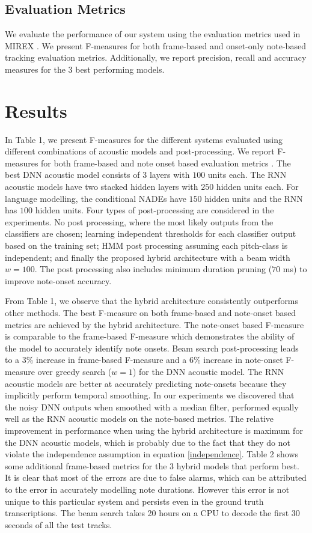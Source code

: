 \documentclass{article}
\begin{document}
\subsection{Evaluation Metrics}

We evaluate the performance of our system using the evaluation metrics used in MIREX \cite{bay2009evaluation}. We present F-measures for both frame-based and onset-only note-based tracking evaluation metrics. Additionally, we report precision, recall and accuracy measures for the 3 best performing models.

\section{Results}
In Table 1, we present F-measures for the different systems evaluated using different combinations of acoustic models and post-processing. We report F-measures for both frame-based and note onset based evaluation metrics \cite{bay2009evaluation}. The best DNN acoustic model consists of $3$ layers with $100$ units each. The RNN acoustic models have two stacked hidden layers with $250$ hidden units each. For language modelling, the conditional NADEs have $150$ hidden units and the RNN has $100$ hidden units. Four types of post-processing are considered in the experiments. No post processing, where the most likely outputs from the classifiers are chosen; learning independent thresholds for each classifier output based on the training set; HMM post processing assuming each pitch-class is independent; and finally the proposed hybrid architecture with a beam width $w = 100$. The post processing also includes minimum duration pruning ($70$ ms) to improve note-onset accuracy. 

From Table 1, we observe that the hybrid architecture consistently outperforms other methods. The best F-measure on both frame-based and note-onset based metrics are achieved by the hybrid architecture. The note-onset based F-measure is comparable to the frame-based F-measure which demonstrates the ability of the model to accurately identify note onsets. Beam search post-processing leads to a $3\%$ increase in frame-based F-measure and a $6\%$ increase in note-onset F-measure over greedy search ($w = 1$) for the DNN acoustic model. The RNN acoustic models are better at accurately predicting note-onsets because they implicitly perform temporal smoothing. In our experiments we discovered that the noisy DNN outputs when smoothed with a median filter, performed equally well as the RNN acoustic models on the note-based metrics. The relative improvement in performance when using the hybrid architecture is maximum for the DNN acoustic models, which is probably due to the fact that they do not violate the independence assumption in equation \ref{independence}.  Table 2 shows some additional frame-based metrics for the 3 hybrid models that perform best. It is clear that most of the errors are due to false alarms, which can be attributed to the error in accurately modelling note durations. However this error is not unique to this particular system and persists even in the ground truth transcriptions. The beam search takes 20 hours on a CPU to decode the first 30 seconds of all the test tracks. 
\end{document}
